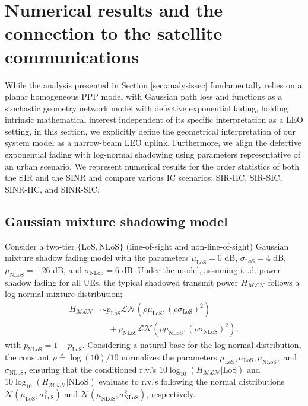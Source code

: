 \documentclass[lettersize,journal]{IEEEtran}
\begin{document}
  






\section{Numerical results and the connection to the satellite communications}

\label{sec:numericalresultsandconnectiontoLEO}
While the analysis presented in Section \ref{sec:analysissec} fundamentally relies on a planar homogeneous PPP model with Gaussian path loss and functions as a stochastic geometry network model with defective exponential fading, holding intrinsic mathematical interest independent of its specific interpretation as a LEO setting, in this section, we explicitly define the geometrical interpretation of our system model as a narrow-beam LEO uplink. Furthermore, we align the defective exponential fading with log-normal shadowing using parameters representative of an urban scenario. We represent numerical results for the order statistics of both the SIR and the SINR and compare various IC scenarios: SIR-IIC, SIR-SIC, SINR-IIC, and SINR-SIC.



\subsection{Gaussian mixture shadowing model}
\label{sec:guassianmixture}

Consider a two-tier $\{\text{LoS},\text{NLoS}\}$ (line-of-sight and non-line-of-sight) Gaussian mixture shadow fading model with the parameters $\mu_{\text{LoS}} = 0$ dB, $\sigma_{\text{LoS}} = 4$ dB, $\mu_{\text{NLoS}} = -26$ dB, and $\sigma_{\text{NLoS}} = 6$ dB. Under the model, assuming i.i.d. power shadow fading for all UEs, the typical shadowed transmit power $H_{\mathcal{M}\mathcal{L}\mathcal{N}}$ follows a log-normal mixture distribution;
\begin{align}
  \label{eq:tier2lognormal}
  H_{\mathcal{M}\mathcal{L}\mathcal{N}} &\sim p_{\text{LoS}} \mathcal{L}\mathcal{N}(\rho \mu_{\text{LoS}}, (\rho \sigma_{\text{LoS}})^2) \nonumber \\
  &\quad + p_{\text{NLoS}} \mathcal{L}\mathcal{N}(\rho \mu_{\text{NLoS}}, (\rho \sigma_{\text{NLoS}})^2),
\end{align}
with $p_{\text{NLoS}}= 1 - p_{\text{LoS}}$. Considering a natural base for the log-normal distribution, the constant $\rho \triangleq \log(10)/10$ normalizes the parameters $\mu_{\text{LoS}}, \sigma_{\text{LoS}}, \mu_{\text{NLoS}},$ and $\sigma_{\text{NLoS}}$, ensuring that the conditioned r.v.'s $10 \log_{10}(H_{\mathcal{MLN}}|\text{LoS})$ and $10 \log_{10}(H_{\mathcal{MLN}}|\text{NLoS})$ evaluate to r.v.'s following the normal distributions $\mathcal{N}(\mu_{\text{LoS}}, \sigma_{\text{LoS}}^2)$ and $\mathcal{N}(\mu_{\text{NLoS}}, \sigma_{\text{NLoS}}^2)$, respectively.
\end{document}
